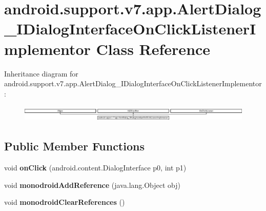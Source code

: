 \hypertarget{classandroid_1_1support_1_1v7_1_1app_1_1_alert_dialog___i_dialog_interface_on_click_listener_implementor}{}\section{android.\+support.\+v7.\+app.\+Alert\+Dialog\+\_\+\+I\+Dialog\+Interface\+On\+Click\+Listener\+Implementor Class Reference}
\label{classandroid_1_1support_1_1v7_1_1app_1_1_alert_dialog___i_dialog_interface_on_click_listener_implementor}
Inheritance diagram for android.\+support.\+v7.\+app.\+Alert\+Dialog\+\_\+\+I\+Dialog\+Interface\+On\+Click\+Listener\+Implementor\+:\begin{figure}[H]
\begin{center}
\leavevmode
\includegraphics[height=0.790960cm]{classandroid_1_1support_1_1v7_1_1app_1_1_alert_dialog___i_dialog_interface_on_click_listener_implementor}
\end{center}
\end{figure}
\subsection*{Public Member Functions}
\begin{DoxyCompactItemize}
\item 
\mbox{\label{classandroid_1_1support_1_1v7_1_1app_1_1_alert_dialog___i_dialog_interface_on_click_listener_implementor_a8e35c027fd2de981ed97054edd6cb86f}} 
void {\bfseries on\+Click} (android.\+content.\+Dialog\+Interface p0, int p1)
\item 
\mbox{\label{classandroid_1_1support_1_1v7_1_1app_1_1_alert_dialog___i_dialog_interface_on_click_listener_implementor_a7625377f1befd57755de35ba74a4fb9f}} 
void {\bfseries monodroid\+Add\+Reference} (java.\+lang.\+Object obj)
\item 
\mbox{\label{classandroid_1_1support_1_1v7_1_1app_1_1_alert_dialog___i_dialog_interface_on_click_listener_implementor_ab97868ba78e36937f05c4e816bb3cb5b}} 
void {\bfseries monodroid\+Clear\+References} ()
\end{DoxyCompactItemize}
